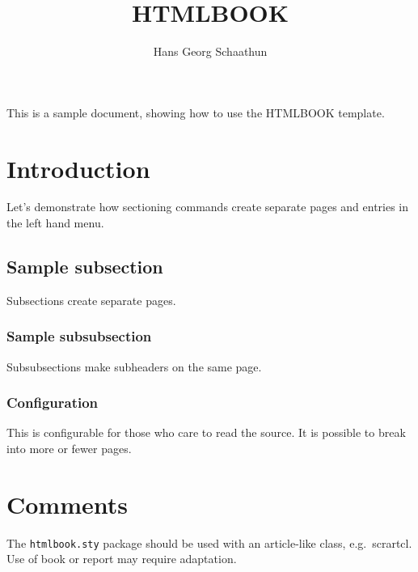 \documentclass[12pt,nynorsk]{scrartcl}
\title{HTMLBOOK}
\subtitle{}
\author{Hans Georg Schaathun}
\begin{document}
%

This is a sample document, showing how to use the HTMLBOOK template.

\section{Introduction}

Let's demonstrate how sectioning commands create separate pages and 
entries in the left hand menu.

\subsection{Sample subsection}

Subsections create separate pages.

\subsubsection{Sample subsubsection}

Subsubsections make subheaders on the same page.

\subsubsection{Configuration}

This is configurable for those who care to read the source. It is
possible to break into more or fewer pages.

\section{Comments}

The \texttt{htmlbook.sty} package should be used with an article-like
class, e.g.\ scrartcl. Use of book or report may require adaptation.
\end{document}
